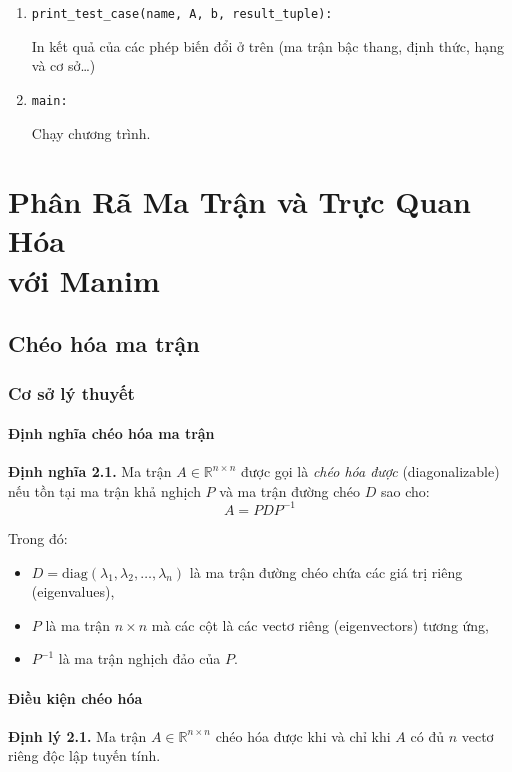 \documentclass[a4paper,12pt]{report}
\begin{document}
\begin{enumerate}

\item \texttt{print\_test\_case(name, A, b, result\_tuple):}

\smallskip
\noindent In kết quả của các phép biến đổi ở trên (ma trận bậc thang, định thức, hạng và cơ sở…)

\item \texttt{main:}

\smallskip
\noindent Chạy chương trình.

\end{enumerate}

\chapter[Phân Rã Ma Trận và Trực Quan Hóa với Manim]{Phân Rã Ma Trận và Trực Quan Hóa \\ \hspace*{3cm}với Manim}
\section{Chéo hóa ma trận}

\subsection{Cơ sở lý thuyết}

\subsubsection{Định nghĩa chéo hóa ma trận}
\textbf{Định nghĩa 2.1.} Ma trận $A \in \mathbb{R}^{n \times n}$ được gọi là \textit{chéo hóa được} (diagonalizable) nếu tồn tại ma trận khả nghịch $P$ và ma trận đường chéo $D$ sao cho:
\[
  A = P D P^{-1}
\]

Trong đó:
\begin{itemize}
  \item $D = \mathrm{diag}(\lambda_1, \lambda_2, \ldots, \lambda_n)$ là ma trận đường chéo chứa các giá trị riêng (eigenvalues),
  \item $P$ là ma trận $n \times n$ mà các cột là các vectơ riêng (eigenvectors) tương ứng,
  \item $P^{-1}$ là ma trận nghịch đảo của $P$.
\end{itemize}

\subsubsection{Điều kiện chéo hóa}
\textbf{Định lý 2.1.} Ma trận $A \in \mathbb{R}^{n \times n}$ chéo hóa được khi và chỉ khi $A$ có đủ $n$ vectơ riêng độc lập tuyến tính.
\end{document}
